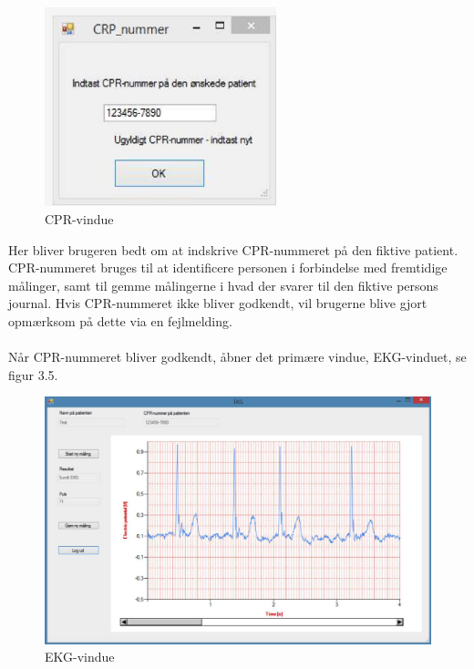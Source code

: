 \begin{figure}[H]
	\centering
	\includegraphics[width=0.6\textwidth]{Figurer/Snip20150430_39}
	\caption{CPR-vindue}
\end{figure} 

Her bliver brugeren bedt om at indskrive CPR-nummeret på den fiktive patient. CPR-nummeret bruges til at identificere personen i forbindelse med fremtidige målinger, samt til gemme målingerne i hvad der svarer til den fiktive persons journal. Hvis CPR-nummeret ikke bliver godkendt, vil brugerne blive gjort opmærksom på dette via en fejlmelding. 
\\
\\
Når CPR-nummeret bliver godkendt, åbner det primære vindue, EKG-vinduet, se figur 3.5. 

\begin{figure}[H]
	\centering
	\includegraphics[width=1.0\textwidth]{Figurer/Snip20150525_25}
	\caption{EKG-vindue}
\end{figure}


